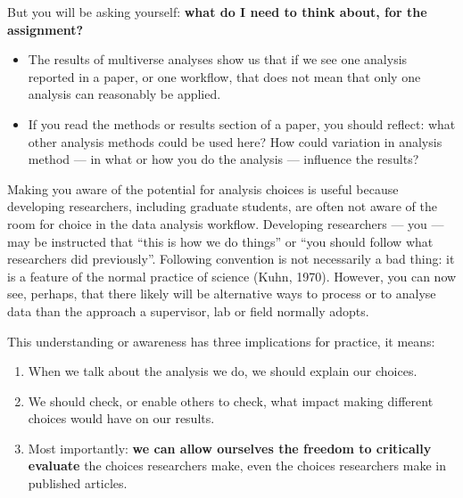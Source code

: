 \documentclass[
  letterpaper,
  DIV=11,
  numbers=noendperiod]{scrreprt}
\providecommand{\tightlist}{%
  \setlength{\itemsep}{0pt}\setlength{\parskip}{0pt}}\usepackage{longtable,booktabs,array}
\begin{document}
But you will be asking yourself: \textbf{what do I need to think about,
for the assignment?}

\begin{tcolorbox}[enhanced jigsaw, opacitybacktitle=0.6, title=\textcolor{quarto-callout-tip-color}{\faLightbulb}\hspace{0.5em}{Tip}, arc=.35mm, colbacktitle=quarto-callout-tip-color!10!white, colframe=quarto-callout-tip-color-frame, leftrule=.75mm, opacityback=0, breakable, titlerule=0mm, left=2mm, bottomrule=.15mm, toprule=.15mm, colback=white, coltitle=black, bottomtitle=1mm, toptitle=1mm, rightrule=.15mm]

\begin{itemize}
\tightlist
\item
  The results of multiverse analyses show us that if we see one analysis
  reported in a paper, or one workflow, that does not mean that only one
  analysis can reasonably be applied.
\item
  If you read the methods or results section of a paper, you should
  reflect: what other analysis methods could be used here? How could
  variation in analysis method --- in what or how you do the analysis
  --- influence the results?
\end{itemize}

\end{tcolorbox}

Making you aware of the potential for analysis choices is useful because
developing researchers, including graduate students, are often not aware
of the room for choice in the data analysis workflow. Developing
researchers --- you --- may be instructed that ``this is how we do
things'' or ``you should follow what researchers did previously''.
Following convention is not necessarily a bad thing: it is a feature of
the normal practice of science (Kuhn, 1970). However, you can now see,
perhaps, that there likely will be alternative ways to process or to
analyse data than the approach a supervisor, lab or field normally
adopts.

This understanding or awareness has three implications for practice, it
means:

\begin{enumerate}
\def\labelenumi{\arabic{enumi}.}
\tightlist
\item
  When we talk about the analysis we do, we should explain our choices.
\item
  We should check, or enable others to check, what impact making
  different choices would have on our results.
\item
  Most importantly: \textbf{we can allow ourselves the freedom to
  critically evaluate} the choices researchers make, even the choices
  researchers make in published articles.
\end{enumerate}
\end{document}
